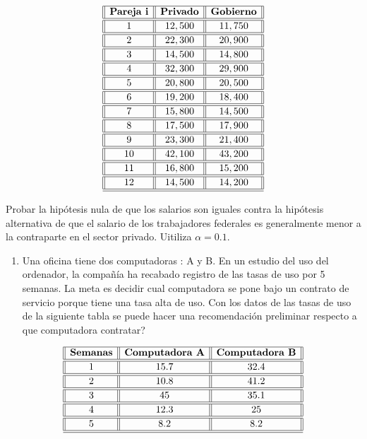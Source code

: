 \documentclass[
  a4paper,
  oneside,
  openany]{book}
\providecommand{\tightlist}{%
  \setlength{\itemsep}{0pt}\setlength{\parskip}{0pt}}
\begin{document}
\[
\begin{array}{||c| |c| |c||} 
\hline 
\textbf{Pareja i}  & \textbf{Privado} & \textbf{Gobierno} \\ 
\hline
\hline
1 &12,500& 11,750 \\
\hline
\hline
2& 22,300 &20,900 \\
\hline
\hline
3 &14,500 &14,800 \\
\hline
\hline
4 &32,300 &29,900 \\
\hline
\hline
5 &20,800 &20,500 \\
\hline
\hline
6 &19,200 &18,400 \\
\hline
\hline
7 &15,800 &14,500 \\
\hline
\hline
8 &17,500 &17,900 \\
\hline
\hline
9 &23,300 &21,400 \\
\hline
\hline
10 &42,100 &43,200 \\
\hline
\hline
11 &16,800 &15,200 \\
\hline
\hline
12& 14,500 &14,200 \\
\hline
\hline
\end{array}
\]

Probar la hipótesis nula de que los salarios son iguales contra la hipótesis alternativa de que el salario de los trabajadores federales es generalmente menor a la contraparte en el sector privado. Uitiliza \(\alpha=0.1\).

\begin{enumerate}
\def\labelenumi{\arabic{enumi}.}
\setcounter{enumi}{1}
\tightlist
\item
  Una oficina tiene dos computadoras : A y B. En un estudio del uso del ordenador, la compañía ha recabado registro de las tasas de uso por 5 semanas. La meta es decidir cual computadora se pone bajo un contrato de servicio porque tiene una tasa alta de uso. Con los datos de las tasas de uso de la siguiente tabla se puede hacer una recomendación preliminar respecto a que computadora contratar?
\end{enumerate}

\[
\begin{array}{||c| |c| |c||} 
\hline 
\textbf{Semanas} & \textbf{Computadora A} & \textbf{Computadora B} \\ 
\hline
\hline
1 &15.7& 32.4 \\
\hline
\hline
2& 10.8 &41.2 \\
\hline
\hline
3 &45   & 35.1 \\
\hline
\hline
4 &12.3& 25 \\
\hline
\hline
5 & 8.2&8.2 \\
\hline
\hline
\end{array}
\]
\end{document}
